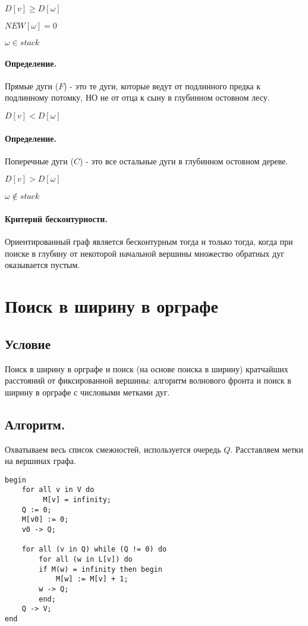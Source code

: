 \documentclass{report}
\begin{document}
$D[v] \ge  D[\omega]$

$NEW[\omega] = 0$

$\omega \in stack$

\paragraph*{Определение.}
Прямые дуги ($F$) - это те дуги, которые ведут от подлинного предка к подлинному потомку, НО
не от отца к сыну в глубинном остовном лесу.

$D[v] < D[\omega]$

\paragraph*{Определение.}
Поперечные дуги ($C$) - это все остальные дуги в глубинном остовном дереве.

$D[v] > D[\omega]$

$\omega \notin stack $

\paragraph*{Критерий бесконтурности.}
Ориентированный граф является бесконтурным тогда и только тогда, когда при поиске в глубину
от некоторой начальной вершины множество обратных дуг оказывается пустым.

\newpage

\section{Поиск в ширину в орграфе}
\subsection{Условие}
Поиск в ширину в орграфе и поиск (на основе поиска в ширину) кратчайших расстояний
от фиксированной вершины: алгоритм волнового фронта и поиск в ширину в орграфе
с числовыми метками дуг.

\subsection{Алгоритм.}
Охватываем весь список смежностей, используется очередь $Q$. Расставляем метки
на вершинах графа.

 \begin{lstlisting}
begin
    for all v in V do
         M[v] = infinity;
    Q := 0;
    M[v0] := 0;
    v0 -> Q;

    for all (v in Q) while (Q != 0) do
        for all (w in L[v]) do
	    if M(w) = infinity then begin
	        M[w] := M[v] + 1;
		w -> Q;
	    end;
	Q -> V;
end
\end{lstlisting}
\end{document}

